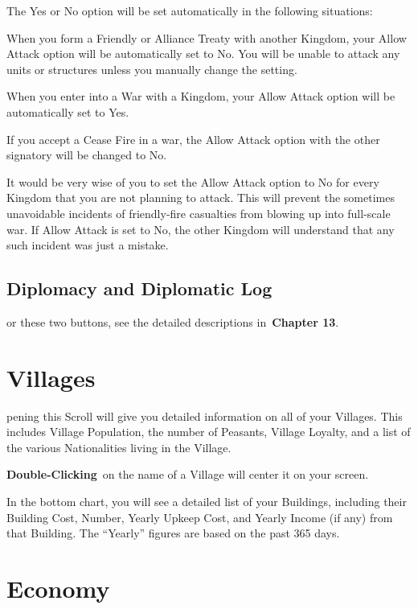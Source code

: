 The Yes or No option will be set automatically in the following situations:

\begin{changemargin}{.1cm}{0cm} %

	
When you form a Friendly or Alliance Treaty with another Kingdom, your Allow Attack option will be automatically set to No. You will be unable to attack any units or structures unless you manually change the setting.

When you enter into a War with a Kingdom, your Allow Attack option will be automatically set to Yes.

If you accept a Cease Fire in a war, the Allow Attack option with the other signatory will be changed to No.
\end{changemargin}

It would be very wise of you to set the Allow Attack option to No for every Kingdom that you are not planning to attack. This will prevent the sometimes unavoidable incidents of friendly-fire casualties from blowing up into full-scale war. If Allow Attack is set to No, the other Kingdom will understand that any such incident was just a mistake.

\subsection{Diplomacy and Diplomatic Log}

or these two buttons, see the detailed descriptions in \textbf{Chapter 13}.

\section{Villages}

pening this Scroll will give you detailed information on all of your Villages. This includes Village Population, the number of Peasants, Village Loyalty, and a list of the various Nationalities living in the Village.

\textbf{Double-Clicking} on the name of a Village will center it on your screen.

In the bottom chart, you will see a detailed list of your Buildings, including their Building Cost, Number, Yearly Upkeep Cost, and Yearly Income (if any) from that Building. The “Yearly” figures are based on the past 365 days.

\section{Economy}

